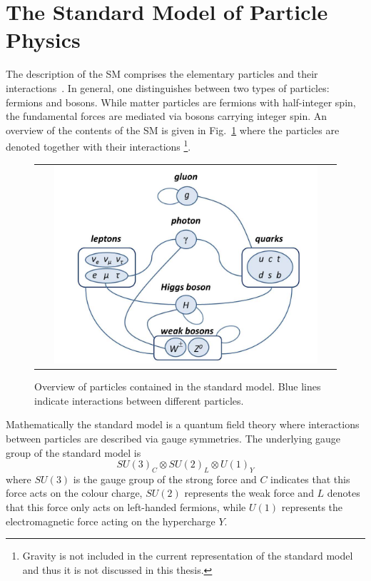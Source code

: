 \section{The Standard Model of Particle Physics}
\label{sec:sm}
The description of the SM comprises the elementary particles and their interactions~\cite{bib:PDG:2012}. In general, one distinguishes between two types of particles: fermions and bosons. While matter particles are fermions with half-integer spin, the fundamental forces are mediated via bosons carrying integer spin. An overview of the contents of the SM is given in Fig.~\ref{fig:SM} where the particles are denoted together with their interactions \footnote{Gravity is not included in the current representation of the standard model and thus it is not discussed in this thesis.}. \\
\begin{figure}[!tp]
  \centering 
  \begin{tabular}{c}
    \includegraphics[width=0.9\textwidth]{figures/SM.jpg}
  \end{tabular}
  \caption{Overview of particles contained in the standard model. Blue lines indicate interactions between different particles.}
  \label{fig:SM}
\end{figure}
Mathematically the standard model is a quantum field theory where interactions between particles are described via gauge symmetries. The underlying gauge group of the standard model is 
\begin{equation*}
SU(3)_{C} \otimes SU(2)_{L} \otimes U(1)_{Y}
\end{equation*}
where $SU(3)$ is the gauge group of the strong force and $C$ indicates that this force acts on the colour charge, $SU(2)$ represents the weak force and $L$ denotes that this force only acts on left-handed fermions, while $U(1)$ represents the electromagnetic force acting on the hypercharge $Y$.\\
